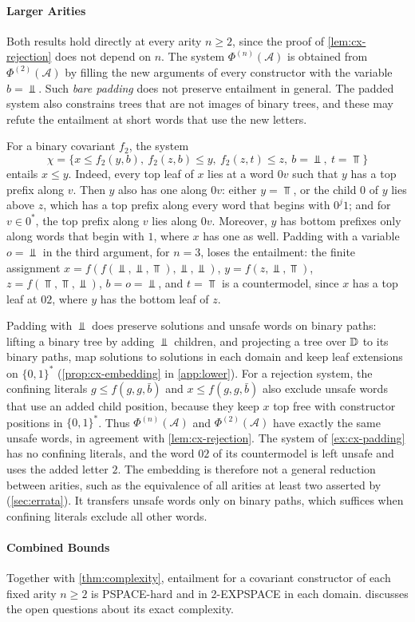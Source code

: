 \paragraph{Larger Arities}
Both results hold directly at every arity $n\ge2$, since the proof of
\cref{lem:cx-rejection} does not depend on $n$. The system
$\Phi^{(n)}(\mathcal A)$ is obtained from $\Phi^{(2)}(\mathcal A)$ by filling
the new arguments of every constructor with the variable $b=\Bot$. Such
\emph{bare padding} does not preserve entailment in general. The padded
system also constrains trees that are not images of binary trees, and these
may refute the entailment at short words that use the new letters.

\begin{example}\label{ex:cx-padding}
For a binary covariant $f_2$, the system
\[
 \chi=\{x\le f_2(y,b),\ f_2(z,b)\le y,\ f_2(z,t)\le z,\ b=\Bot,\ t=\Top\}
\]
entails $x\le y$. Indeed, every top leaf of $x$ lies at a word $0v$ such that
$y$ has a top prefix along $v$. Then $y$ also has one along $0v$: either
$y=\Top$, or the child $0$ of $y$ lies above $z$, which has a top prefix along
every word that begins with $0^j1$; and for $v\in0^*$, the top prefix along
$v$ lies along $0v$. Moreover, $y$ has bottom prefixes only along words that
begin with $1$, where $x$ has one as well. Padding with a variable $o=\Bot$
in the third argument, for $n=3$, loses the entailment: the finite assignment
$x=f(f(\Bot,\Bot,\Top),\Bot,\Bot)$, $y=f(z,\Bot,\Top)$, $z=f(\Top,\Top,\Bot)$,
$b=o=\Bot$, and $t=\Top$ is a countermodel, since $x$ has a top leaf at $02$,
where $y$ has the bottom leaf of $z$.
\end{example}

Padding with $\Bot$ does preserve solutions and unsafe words on binary
paths: lifting a binary tree by adding $\Bot$ children, and projecting a tree
over $\mathbb{D}$ to its binary paths, map solutions to solutions in each domain
and keep leaf extensions on $\{0,1\}^*$ (\cref{prop:cx-embedding} in
\cref{app:lower}). For a rejection system, the confining literals
$g\le f(g,g,\bar b)$ and $x\le f(g,g,\bar b)$ also exclude unsafe words that
use an added child position, because they keep $x$ top free with constructor
positions in $\{0,1\}^*$. Thus $\Phi^{(n)}(\mathcal A)$ and
$\Phi^{(2)}(\mathcal A)$ have exactly the same unsafe words, in agreement
with \cref{lem:cx-rejection}. The system of \cref{ex:cx-padding} has no
confining literals, and the word $02$ of its countermodel is left unsafe and
uses the added letter $2$. The embedding is therefore not a general
reduction between arities, such as the equivalence of all arities at least
two asserted by \citet[Corollary~1]{NiehrenPriesnitz03} (\cref{sec:errata}).
It transfers unsafe words only on binary paths, which suffices when
confining literals exclude all other words.

\paragraph{Combined Bounds}
Together with \cref{thm:complexity}, entailment for a covariant constructor
of each fixed arity $n\ge2$ is PSPACE-hard and in 2-EXPSPACE in each domain.
 discusses the open questions about its exact complexity.
